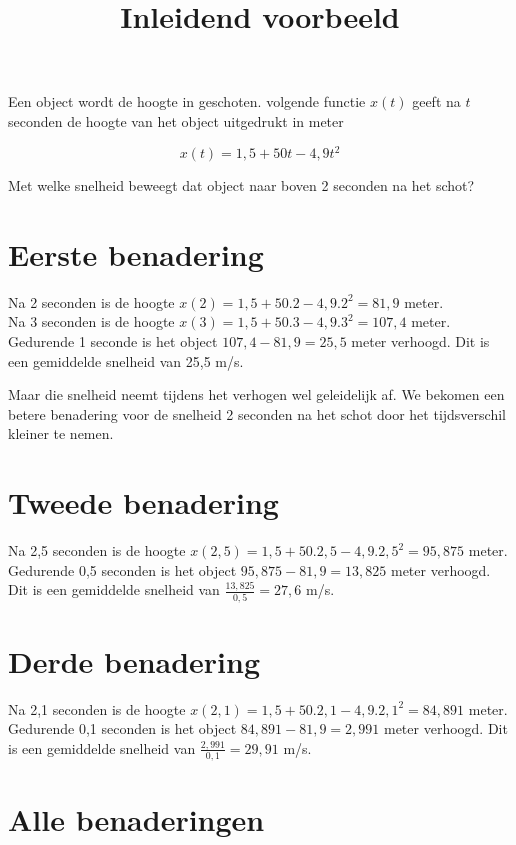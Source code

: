 \documentclass{article}
\title{Inleidend voorbeeld}
\date { }
\begin{document}
\maketitle \noindent


\noindent Een object wordt de hoogte in geschoten.
volgende functie $x(t)$ geeft na $t$ seconden de hoogte van het object uitgedrukt in meter

\[
x(t)=1,5+50 t -4,9 t^2
\]

\noindent Met welke snelheid beweegt dat object naar boven 2 seconden na het schot?

\section{Eerste benadering}

Na 2 seconden is de hoogte $x(2)=1,5+50.2-4,9.2^2=81,9$ meter.\\
Na 3 seconden is de hoogte $x(3)=1,5+50.3-4,9.3^2=107,4$ meter.\\
Gedurende 1 seconde is het object $107,4-81,9=25,5$ meter verhoogd.
Dit is een gemiddelde snelheid van 25,5 m/s. \vspace{5mm}

\noindent Maar die snelheid neemt tijdens het verhogen wel geleidelijk af.
We bekomen een betere benadering voor de snelheid 2 seconden na het schot door het tijdsverschil kleiner te nemen.

\section{Tweede benadering}

Na 2,5 seconden is de hoogte  $x(2,5)=1,5+50.2,5-4,9.2,5^2=95,875$ meter.\\
Gedurende 0,5 seconden is het object $95,875-81,9=13,825$ meter verhoogd.
Dit is een gemiddelde snelheid van $\frac{13,825}{0,5}=27,6$ m/s.

\section{Derde benadering}

Na 2,1 seconden is de hoogte $x(2,1)=1,5+50.2,1-4,9.2,1^2=84,891$ meter.\\
Gedurende 0,1 seconden is het object $84,891-81,9=2,991$ meter verhoogd.
Dit is een gemiddelde snelheid van $\frac{2,991}{0,1}=29,91$ m/s.

\section{Alle benaderingen}
\end{document}
